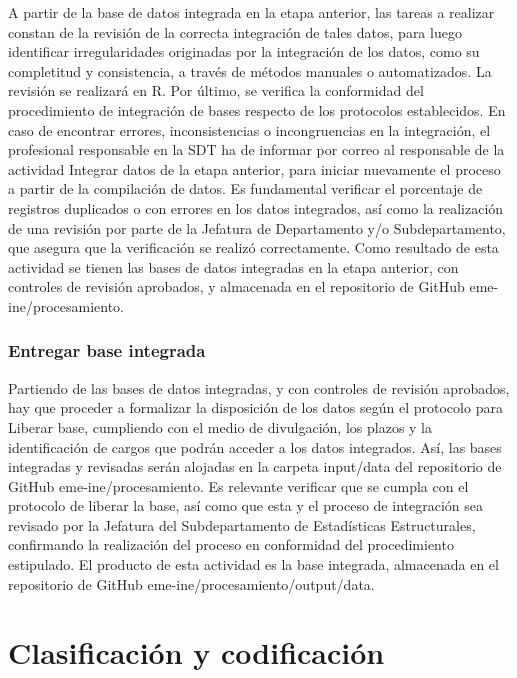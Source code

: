 \documentclass[
]{article}
\begin{document}
A partir de la base de datos integrada en la etapa anterior, las tareas a realizar constan de la revisión de la correcta integración de tales datos, para luego identificar irregularidades originadas por la integración de los datos, como su completitud y consistencia, a través de métodos manuales o automatizados. La revisión se realizará en R. Por último, se verifica la conformidad del procedimiento de integración de bases respecto de los protocolos establecidos. En caso de encontrar errores, inconsistencias o incongruencias en la integración, el profesional responsable en la SDT ha de informar por correo al responsable de la actividad Integrar datos de la etapa anterior, para iniciar nuevamente el proceso a partir de la compilación de datos. Es fundamental verificar el porcentaje de registros duplicados o con errores en los datos integrados, así como la realización de una revisión por parte de la Jefatura de Departamento y/o Subdepartamento, que asegura que la verificación se realizó correctamente. Como resultado de esta actividad se tienen las bases de datos integradas en la etapa anterior, con controles de revisión aprobados, y almacenada en el repositorio de GitHub eme-ine/procesamiento.

\hypertarget{entregar-base-integrada}{%
\subsubsection{Entregar base integrada}\label{entregar-base-integrada}}

Partiendo de las bases de datos integradas, y con controles de revisión aprobados, hay que proceder a formalizar la disposición de los datos según el protocolo para Liberar base, cumpliendo con el medio de divulgación, los plazos y la identificación de cargos que podrán acceder a los datos integrados. Así, las bases integradas y revisadas serán alojadas en la carpeta input/data del repositorio de GitHub eme-ine/procesamiento. Es relevante verificar que se cumpla con el protocolo de liberar la base, así como que esta y el proceso de integración sea revisado por la Jefatura del Subdepartamento de Estadísticas Estructurales, confirmando la realización del proceso en conformidad del procedimiento estipulado. El producto de esta actividad es la base integrada, almacenada en el repositorio de GitHub eme-ine/procesamiento/output/data.

\newpage

\hypertarget{clasificaciuxf3n-y-codificaciuxf3n}{%
\section{Clasificación y codificación}\label{clasificaciuxf3n-y-codificaciuxf3n}}
\end{document}
